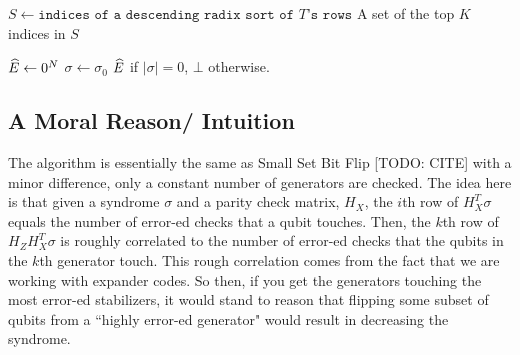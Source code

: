 \begin{algorithm}
	\caption{$\texttt{sort-top-K(T)}$}\label{alg:sort-top-k}
	\BlankLine
	$S \gets \texttt{indices of a descending radix sort of $T$'s rows}$\;
	\BlankLine
	\Return A set of the top $K$ indices in $S$\;
\end{algorithm}

\begin{algorithm}
	\caption{$\texttt{probabilistic-set-flip($E$)}$}\label{alg:pfm}
	$\widehat{E} \gets 0^{N}$\;
	$\sigma \gets \sigma_0$\;
		\Return $\widehat{E}$ if $|\sigma| = 0$, $\bot$ otherwise.
\end{algorithm}

\subsection{A Moral Reason/ Intuition}
The algorithm is essentially the same as Small Set Bit Flip [TODO: CITE] with a minor
difference, only a constant number of generators are checked.
The idea here is that given a syndrome $\sigma$ and a parity check matrix, $H_X$,
the $i$th row of $H_X^T \sigma$ equals the number of error-ed checks that a
qubit touches. Then, the $k$th row of $H_ZH_X^T\sigma$ is roughly correlated to
the number of error-ed checks that the qubits in the $k$th generator touch.
This rough correlation comes from the fact that we are working with expander codes.
So then, if you get the generators touching the most error-ed stabilizers, 
it would stand to reason that flipping some subset of qubits from a ``highly error-ed generator" would
result in decreasing the syndrome.
